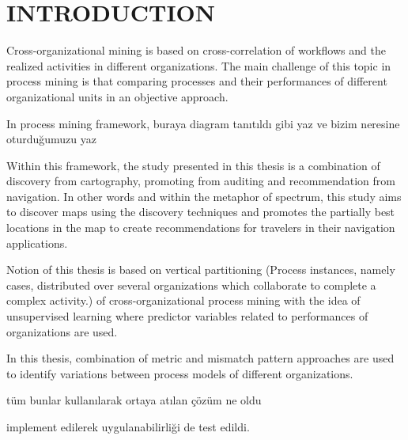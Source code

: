 \chapter{INTRODUCTION}
\label{chp:introduction}



Cross-organizational mining is based on cross-correlation of workflows
and the realized activities in different organizations. The main challenge of this topic
in process mining is that comparing processes and their performances of different
organizational units in an objective approach.



In process mining framework, buraya diagram tanıtıldı gibi yaz ve bizim neresine oturduğumuzu yaz

Within this framework, the study presented in this thesis is a combination of discovery
from cartography, promoting from auditing and recommendation from navigation. In
other words and within the metaphor of spectrum, this study aims to discover maps
using the discovery techniques and promotes the partially best locations in the map to
create recommendations for travelers in their navigation applications.

Notion of this thesis is based on
vertical partitioning (Process instances, namely cases, distributed over several organizations
which collaborate to complete a complex activity.) of cross-organizational process mining with the idea of unsupervised
learning where predictor variables related to performances of organizations are
used.

In this thesis, combination of metric and mismatch pattern approaches are used to identify variations between process models of different organizations.

tüm bunlar kullanılarak ortaya atılan çözüm ne oldu

implement edilerek uygulanabilirliği de test edildi.
